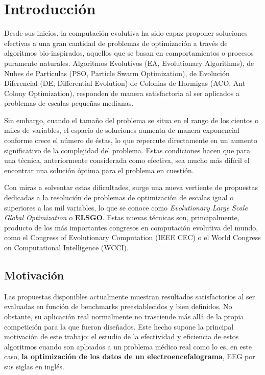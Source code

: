 \chapter{Introducción}

Desde sus inicios, la computación evolutiva ha sido capaz proponer soluciones efectivas a una gran cantidad de problemas de optimización a través de algoritmos bio-inspirados, aquellos que se basan en comportamientos o procesos puramente naturales. Algoritmos Evolutivos (EA, Evolutionary Algorithms), de Nubes de Partículas (PSO, Particle Swarm Optimization), de Evolución Diferencial (DE, Differential Evolution) de Colonias de Hormigas (ACO, Ant Colony Optimization), responden de manera satisfactoria al ser aplicados a problemas de escalas pequeñas-medianas.

Sin embargo, cuando el tamaño del problema se situa en el rango de los cientos o miles de variables, el espacio de soluciones aumenta de manera exponencial conforme crece el número de éstas, lo que repercute directamente en un aumento significativo de la complejidad del problema. Estas condiciones hacen que para una técnica, anteriormente considerada como efectiva, sea mucho más difícil el encontrar una solución óptima para el problema en cuestión.

Con miras a solventar estas dificultades, surge una nueva vertiente de propuestas dedicadas a la resolución de problemas de optimización de escalas igual o superiores a las mil variables, lo que se conoce como\textit{ Evolutionary Large Scale Global Optimization} o \textbf{ELSGO}. Estas nuevas técnicas son, principalmente, producto de los más importantes congresos en computación evolutiva del mundo, como el Congress of Evolutionary Computation (IEEE CEC) o el World Congress on Computational Intelligence (WCCI).

\section{Motivación}

Las propuestas disponibles actualmente muestran resultados satisfactorios al ser evaluadas en función de benchmarks preestablecidos y bien definidos. No obstante, su aplicación real normalmente no trasciende más allá de la propia competición para la que fueron diseñados. Este hecho supone la principal motivación de este trabajo: el estudio de la efectividad y eficiencia de estos algoritmos cuando son aplicados a un problema médico real como lo es, en este caso, \textbf{la optimización de los datos de un electroencefalograma}, EEG\cite{EEG} por sus siglas en inglés.

